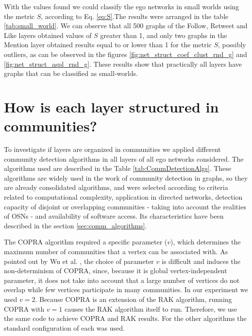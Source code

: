 With the values found we could classify the ego networks in small worlds using the metric $S$, according to Eq. \ref{eq:S}.The results were arranged in the table \ref{tab:small_world}. We can observe that all 500 graphs of the Follow, Retweet and Like layers obtained values of $S$ greater than 1, and only two graphs in the Mention layer obtained results equal to or lower than 1 for the metric $S$, possibly outliers, as can be observed in the figures \ref{fig:net_struct_coef_clust_rnd_g} and \ref{fig:net_struct_aspl_rnd_g}. These results show that practically all layers have graphs that can be classified as small-worlds.





\section{How is each layer structured in communities?}
\label{sec:QuestionCommunities}

To investigate if layers are organized in communities we applied different community detection algorithms in all layers of all ego networks considered. The algorithms used are described in the Table \ref{tab:CommDetectionAlgs}. These algorithms are widely used in the work of community detection in graphs, so they are already consolidated algorithms, and were selected according to criteria related to computational complexity, application in directed networks, detection capacity of disjoint or overlapping communities - taking into account the realities of OSNs - and availability of software access. Its characteristics have been described in the section \ref{sec:comm_algorithms}.

The COPRA algorithm required a specific parameter ($v$), which determines the maximum number of communities that a vertex can be associated with. As pointed out by Wu et al. \cite{Wu2012}, the choice of parameter $v$ is difficult and induces the non-determinism of COPRA, since, because it is global vertex-independent parameter, it does not take into account that a large number of vertices do not overlap while few vertices participate in many communities. In our experiment we used $v = 2$.  Because COPRA is an extension of the RAK algorithm, running COPRA with $v=1$ causes the RAK algorithm itself to run. Therefore, we use the same code to achieve COPRA and RAK results. For the other algorithms the standard configuration of each was used. 

